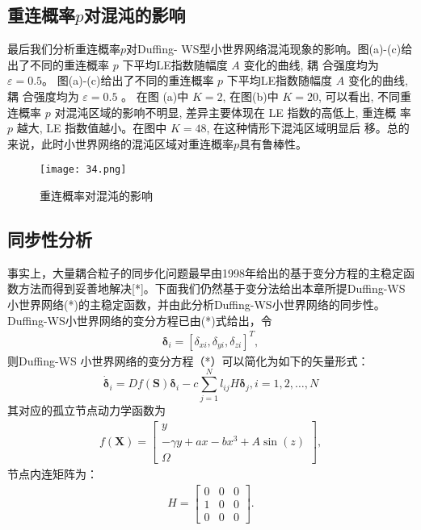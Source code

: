 \subsection{重连概率$p$对混沌的影响}
最后我们分析重连概率$p$对Duffing- WS型小世界网络混沌现象的影响。图(a)-(c)给出了不同的重连概率
 $p$ 下平均LE指数随幅度 $A$ 变化的曲线, 耦 合强度均为 $\varepsilon=0.5$。
图(a)-(c)给出了不同的重连概率 $p$ 下平均LE指数随幅度 $A$ 变化的曲线, 耦 合强度均为 $\varepsilon=0.5$ 。
在图 (a)中 $K=2$, 在图(b)中 $K=20$, 可以看出, 不同重 连概率 $p$ 对混沌区域的影响不明显, 
差异主要体现在 LE 指数的高低上, 重连概 率 $p$ 越大, LE 指数值越小。在图中 $K=48$, 在这种情形下混沌区域明显后
移。总的来说，此时小世界网络的混沌区域对重连概率$p$具有鲁棒性。
\begin{figure}[!htbp]
    \centering
    \texttt{[image: 34.png]}
    \caption{重连概率对混沌的影响}
\end{figure}
\subsection{同步性分析}
事实上，大量耦合粒子的同步化问题最早由1998年给出的基于变分方程的主稳定函数方法而得到妥善地解决[*]。下面我们仍然基于变分法给出本章所提Duffing-WS小世界网络(*)的主稳定函数，并由此分析Duffing-WS小世界网络的同步性。
Duffing-WS小世界网络的变分方程已由(*)式给出，令
\begin{eqnarray*}
\boldsymbol{\delta}_{i}=\left[\delta_{xi}, \delta_{yi}, \delta_{zi}\right]^T,
\end{eqnarray*}
则Duffing-WS 小世界网络的变分方程（*）可以简化为如下的矢量形式：
\begin{equation}
    \dot{\boldsymbol{\delta}}_i=D f(\mathbf{S}) \boldsymbol{\delta}_i-c \sum_{j=1}^N l_{i j} H \boldsymbol{\delta}_j, i=1,2, \ldots, N
\end{equation}
其对应的孤立节点动力学函数为
\begin{eqnarray*}
 f(\mathbf{X})=\left[\begin{array}{c}y \\ -\gamma y+a x-b x^3+A \sin (z) \\ \Omega\end{array}\right],
\end{eqnarray*}
节点内连矩阵为：
\begin{eqnarray*}
H=\left[\begin{array}{lll}
0 & 0 & 0 \\
1 & 0 & 0 \\
0 & 0 & 0
\end{array}\right].
\end{eqnarray*}


